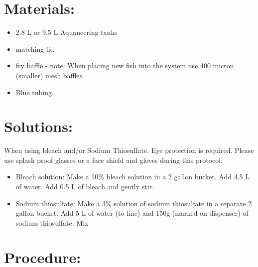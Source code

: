 \documentclass[
  letterpaper,
  DIV=11,
  numbers=noendperiod]{scrreprt}
\providecommand{\tightlist}{%
  \setlength{\itemsep}{0pt}\setlength{\parskip}{0pt}}\usepackage{longtable,booktabs,array}
\begin{document}
\hypertarget{materials-32}{%
\section{Materials:}\label{materials-32}}

\begin{itemize}
\tightlist
\item
  2.8 L or 9.5 L Aquaneering tanks
\item
  matching lid
\item
  fry baffle - note: When placing new fish into the system use 400
  micron (smaller) mesh baffles.
\item
  Blue tubing.
\end{itemize}

\hypertarget{solutions-25}{%
\section{Solutions:}\label{solutions-25}}

\begin{tcolorbox}[enhanced jigsaw, rightrule=.15mm, title=\textcolor{quarto-callout-caution-color}{\faFire}\hspace{0.5em}{Chemical Hygiene}, titlerule=0mm, opacitybacktitle=0.6, toprule=.15mm, bottomrule=.15mm, opacityback=0, left=2mm, colframe=quarto-callout-caution-color-frame, breakable, coltitle=black, colback=white, colbacktitle=quarto-callout-caution-color!10!white, bottomtitle=1mm, leftrule=.75mm, toptitle=1mm, arc=.35mm]

When using bleach and/or Sodium Thiosulfate. Eye protection is required.
Please use splash proof glasses or a face shield and gloves during this
protocol.

\end{tcolorbox}

\begin{itemize}
\tightlist
\item
  Bleach solution: Make a 10\% bleach solution in a 2 gallon bucket. Add
  4.5 L of water. Add 0.5 L of bleach and gently stir.
\item
  Sodium thiosulfate: Make a 3\% solution of sodium thiosulfate in a
  separate 2 gallon bucket. Add 5 L of water (to line) and 150g (marked
  on dispenser) of sodium thiosulfate. Mix
\end{itemize}

\hypertarget{procedure-32}{%
\section{Procedure:}\label{procedure-32}}
\end{document}
